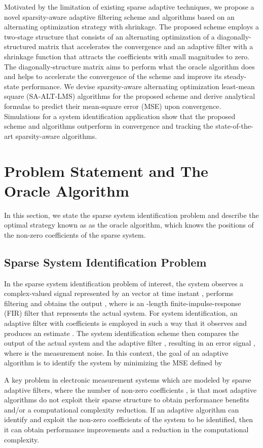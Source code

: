 \documentclass[10pt,onecolumn]{IEEEtran}
\begin{document}
Motivated by the limitation of existing sparse adaptive techniques,
we propose a novel sparsity-aware adaptive filtering scheme and
algorithms based on an alternating optimization strategy with
shrinkage. The proposed scheme employs a two-stage structure that
consists of an alternating optimization of a diagonally-structured
matrix that accelerates the convergence and an adaptive filter with
a shrinkage function that attracts the coefficients with small
magnitudes to zero. The diagonally-structure matrix aims to perform
what the oracle algorithm does and helps to accelerate the
convergence of the scheme and improve its steady-state performance.
We devise sparsity-aware alternating optimization least-mean square
(SA-ALT-LMS) algorithms for the proposed scheme and derive
analytical formulas to predict their mean-square error (MSE) upon
convergence. Simulations for a system identification application
show that the proposed scheme and algorithms outperform in
convergence and tracking the state-of-the-art sparsity-aware
algorithms.

\section{Problem Statement and The Oracle Algorithm}

In this section, we state the sparse system identification problem
and describe the optimal strategy known as as the oracle algorithm,
which knows the positions of the non-zero coefficients of the sparse
system.

\subsection{Sparse System Identification Problem}


In the sparse system identification problem of interest, the system observes a complex-valued signal represented by an  vector  at time instant , performs
filtering and obtains the output , where  is an
-length finite-impulse-response (FIR) filter that represents the
actual system. For system identification, an adaptive filter with
 coefficients  is employed in such a way that
it observes  and produces an estimate
. The system
identification scheme then compares the output of the actual system
 and the adaptive filter , resulting in an error
signal , where  is the
measurement noise. In this context, the goal of an adaptive
algorithm is to identify the system by minimizing the MSE defined by

A key problem in electronic measurement systems which are modeled by
sparse adaptive filters, where the number of non-zero coefficients
, is that most adaptive algorithms do not exploit their
sparse structure to obtain performance benefits and/or a
computational complexity reduction. If an adaptive algorithm can
identify and exploit the non-zero coefficients of the system to be
identified, then it can obtain performance improvements and a
reduction in the computational complexity.
\end{document}
